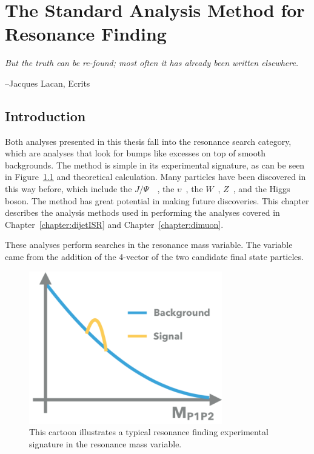 \chapter{The Standard Analysis Method for Resonance Finding}
\label{chapter:analysismethod}

\epigraph{\textit{But the truth can be re-found; most often it has already been written elsewhere.}}{--Jacques Lacan, Ecrits}


\section{Introduction}
Both analyses presented in this thesis fall into the resonance search category, which are analyses that look for bumps like excesses on top of smooth backgrounds. The method is simple in its experimental signature, as can be seen in Figure~\ref{fig:bump} and theoretical calculation. Many particles have been discovered in this way before, which include the $J/\Psi$~\cite{PhysRevLett.33.1406}~\cite{PhysRevLett.33.1404}, the $\upsilon$~\cite{Herb:1977ek}, the $W$~\cite{Arnison:142059}, $Z$~\cite{hollik1984composite}, and the Higgs boson. The method has great potential in making future discoveries. This chapter describes
the analysis methods used in performing the analyses covered in Chapter~\ref{chapter:dijetISR} and Chapter~\ref{chapter:dimuon}. 

These analyses perform searches in the resonance mass variable. The variable came from the addition of the 4-vector of the two candidate final state particles.

\begin{figure}[!htb]
    \begin{center}
        \includegraphics[width=0.75\textwidth]{figures/chapter_analysismethod/resonance}
        \caption{
            This cartoon illustrates a typical resonance finding experimental signature in the resonance mass variable. 
        }
        \label{fig:bump}
    \end{center}
\end{figure}
\FloatBarrier

